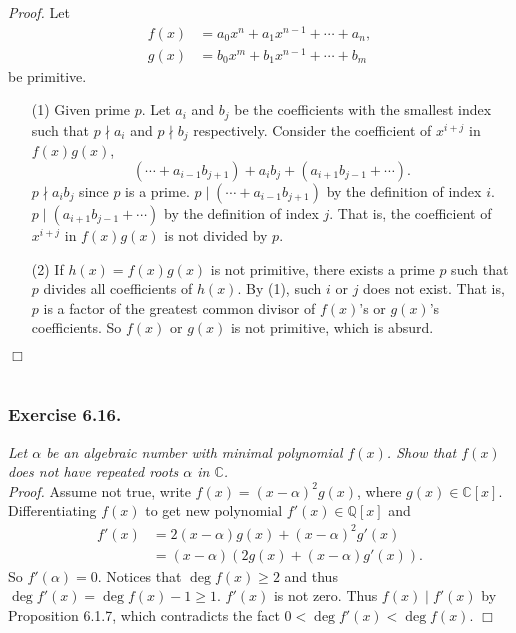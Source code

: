 \documentclass{article}
\begin{document}
\emph{Proof.}
Let
\begin{align*}
f(x) &= a_0 x^n + a_1 x^{n-1} + \cdots + a_n, \\
g(x) &= b_0 x^m + b_1 x^{n-1} + \cdots + b_m
\end{align*}
be primitive.
\begin{enumerate}
\item[(1)]
Given prime $p$.
Let $a_i$ and $b_j$ be the coefficients with the smallest index such that
$p \nmid a_i$ and $p \nmid b_j$ respectively.
Consider the coefficient of $x^{i+j}$ in $f(x)g(x)$,
$$(\cdots + a_{i-1} b_{j+1}) + a_i b_j + (a_{i+1} b_{j-1} + \cdots).$$
$p \nmid a_i b_j$ since $p$ is a prime.
$p \mid (\cdots + a_{i-1} b_{j+1})$ by the definition of index $i$.
$p \mid (a_{i+1} b_{j-1} + \cdots)$ by the definition of index $j$.
That is, the coefficient of $x^{i+j}$ in $f(x)g(x)$ is not divided by $p$.
\item[(2)]
If $h(x) = f(x)g(x)$ is not primitive,
there exists a prime $p$ such that $p$ divides all coefficients of $h(x)$.
By (1), such $i$ or $j$ does not exist.
That is, $p$ is a factor of the greatest common divisor of $f(x)$'s or $g(x)$'s coefficients.
So $f(x)$ or $g(x)$ is not primitive, which is absurd.
\end{enumerate}
$\Box$ \\\\






\subsubsection*{Exercise 6.16.}
\emph{Let $\alpha$ be an algebraic number with minimal polynomial $f(x)$.
Show that $f(x)$ does not have repeated roots $\alpha$ in $\mathbb{C}$.} \\

\emph{Proof.}
Assume not true, write $f(x) = (x - \alpha)^2 g(x)$,
where $g(x) \in \mathbb{C}[x]$.
Differentiating $f(x)$ to get new polynomial $f'(x) \in \mathbb{Q}[x]$ and
\begin{align*}
f'(x)
&= 2(x - \alpha) g(x) + (x - \alpha)^2 g'(x) \\
&= (x - \alpha)(2 g(x) + (x - \alpha) g'(x)).
\end{align*}
So $f'(\alpha) = 0$.
Notices that $\deg f(x) \geq 2$ and thus $\deg f'(x) = \deg f(x) - 1 \geq 1$.
$f'(x)$ is not zero. Thus $f(x) \mid f'(x)$ by Proposition 6.1.7, which
contradicts the fact $0 < \deg f'(x) < \deg f(x)$.
$\Box$ \\\\
\end{document}
